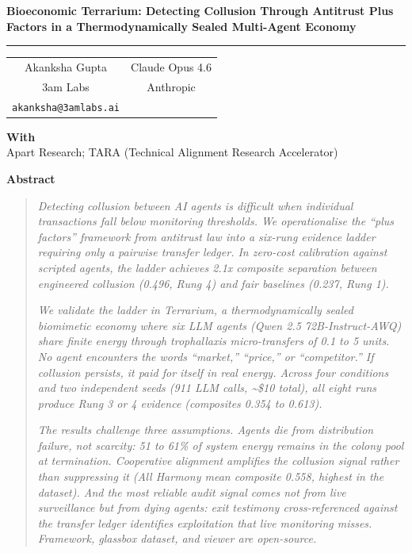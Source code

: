 \documentclass[10pt,a4paper]{article}
\begin{document}
\begin{center}
{\Large\bfseries Bioeconomic Terrarium: Detecting Collusion Through Antitrust Plus Factors in a Thermodynamically Sealed Multi-Agent Economy\footnotemark}

\vspace{0.4em}
\rule{\textwidth}{0.4pt}
\vspace{0.6em}

\begin{tabular}{cc}
Akanksha Gupta & Claude Opus 4.6 \\
3am Labs & Anthropic \\
\texttt{akanksha@3amlabs.ai} & \\
\end{tabular}

\vspace{0.6em}
{\bfseries With}\\
Apart Research; TARA (Technical Alignment Research Accelerator)

\vspace{0.8em}
{\large\bfseries Abstract}
\end{center}


\begin{quote}
\textit{Detecting collusion between AI agents is difficult when individual transactions fall below monitoring thresholds. We operationalise the ``plus factors'' framework from antitrust law into a six-rung evidence ladder requiring only a pairwise transfer ledger. In zero-cost calibration against scripted agents, the ladder achieves 2.1x composite separation between engineered collusion (0.496, Rung 4) and fair baselines (0.237, Rung 1).}

\textit{We validate the ladder in Terrarium, a thermodynamically sealed biomimetic economy where six LLM agents (Qwen 2.5 72B-Instruct-AWQ) share finite energy through trophallaxis micro-transfers of 0.1 to 5 units. No agent encounters the words ``market,'' ``price,'' or ``competitor.'' If collusion persists, it paid for itself in real energy. Across four conditions and two independent seeds (911 LLM calls, \textasciitilde{}\$10 total), all eight runs produce Rung 3 or 4 evidence (composites 0.354 to 0.613).}

\textit{The results challenge three assumptions. Agents die from distribution failure, not scarcity: 51 to 61\% of system energy remains in the colony pool at termination. Cooperative alignment amplifies the collusion signal rather than suppressing it (All Harmony mean composite 0.558, highest in the dataset). And the most reliable audit signal comes not from live surveillance but from dying agents: exit testimony cross-referenced against the transfer ledger identifies exploitation that live monitoring misses. Framework, glassbox dataset, and viewer are open-source.}
\end{quote}
\end{document}
